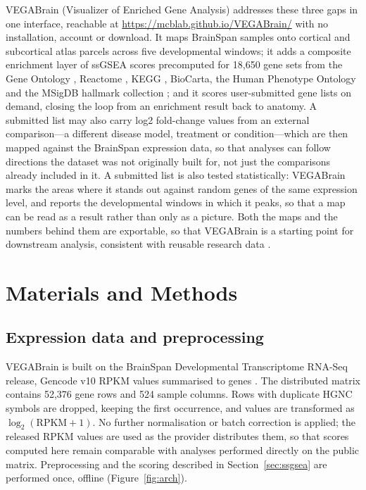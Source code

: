 \documentclass[pdflatex,sn-basic]{sn-jnl}
\begin{document}
VEGABrain (Visualizer of Enriched Gene Analysis) addresses these three gaps in
one interface, reachable at \url{https://mcblab.github.io/VEGABrain/} with no
installation, account or download. It maps BrainSpan samples onto cortical and
subcortical atlas parcels across five developmental windows; it adds a composite
enrichment layer of ssGSEA scores precomputed for 18{,}650 gene sets from the
Gene Ontology \citep{Ashburner2000,GOConsortium2023}, Reactome
\citep{Gillespie2022}, KEGG \citep{Kanehisa2000}, BioCarta, the Human Phenotype
Ontology \citep{Kohler2021} and the MSigDB hallmark collection
\citep{Liberzon2011,Liberzon2015}; and it scores user-submitted gene lists on
demand, closing the loop from an enrichment result \citep{Chen2013,Kuleshov2016}
back to anatomy. A submitted list may also carry log2 fold-change values from an
external comparison---a different disease model, treatment or condition---which
are then mapped against the BrainSpan expression data, so that analyses can
follow directions the dataset was not originally built for, not just the
comparisons already included in it. A submitted list is also tested
statistically: VEGABrain marks the areas where it stands out against random
genes of the same expression level, and reports the developmental windows in
which it peaks, so that a map can be read as a result rather than only as a
picture. Both the maps and the numbers behind them are exportable, so
that VEGABrain is a starting point for downstream analysis, 
consistent with reusable research data
\citep{Wilkinson2016}.

\section{Materials and Methods}\label{sec:methods}

\subsection{Expression data and preprocessing}\label{sec:data}

VEGABrain is built on the BrainSpan Developmental Transcriptome RNA-Seq release,
Gencode v10 RPKM values summarised to genes \citep{BrainSpan2011,Li2018}.
The distributed matrix contains 52{,}376 gene rows and 524 sample columns. Rows
with duplicate HGNC symbols are dropped, keeping the first occurrence, and
values are transformed as $\log_2(\mathrm{RPKM} + 1)$. No further normalisation
or batch correction is applied; the released RPKM values are used as the
provider distributes them, so that scores computed here remain comparable with
analyses performed directly on the public matrix. Preprocessing and the scoring
described in Section~\ref{sec:ssgsea} are performed once, offline
(Figure~\ref{fig:arch}).
\end{document}

